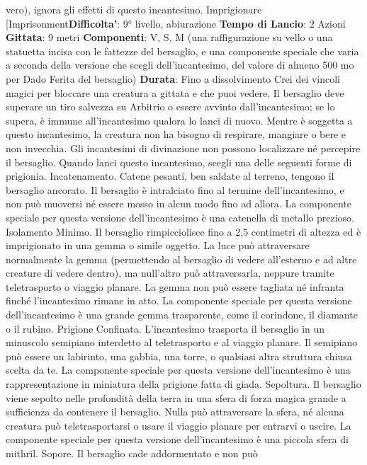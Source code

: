 \begin{multicols}{2}
vero), ignora gli effetti di questo incantesimo.
Imprigionare
[Imprisonment\textbf{Difficolta'}:
9° livello, abiurazione
\textbf{Tempo di Lancio}: 2 Azioni
\textbf{Gittata}: 9 metri
\textbf{Componenti}: V, S, M (una raffigurazione su vello o una
statuetta incisa con le fattezze del bersaglio, e una
componente speciale che varia a seconda della
versione che scegli dell’incantesimo, del valore di
almeno 500 mo per Dado Ferita del bersaglio)
\textbf{Durata}: Fino a dissolvimento
Crei dei vincoli magici per bloccare una creatura a
gittata e che puoi vedere. Il bersaglio deve superare un
tiro salvezza su Arbitrio o essere avvinto
dall’incantesimo; se lo supera, è immune
all’incantesimo qualora lo lanci di nuovo. Mentre è
soggetta a questo incantesimo, la creatura non ha
bisogno di respirare, mangiare o bere e non invecchia.
Gli incantesimi di divinazione non possono localizzare
né percepire il bersaglio.
Quando lanci questo incantesimo, scegli una delle
seguenti forme di prigionia.
Incatenamento. Catene pesanti, ben saldate al
terreno, tengono il bersaglio ancorato. Il bersaglio è
intralciato fino al termine dell’incantesimo, e non può
muoversi né essere mosso in alcun modo fino ad allora.
La componente speciale per questa versione
dell’incantesimo è una catenella di metallo prezioso.
Isolamento Minimo. Il bersaglio rimpicciolisce fino a
2,5 centimetri di altezza ed è imprigionato in una
gemma o simile oggetto. La luce può attraversare
normalmente la gemma (permettendo al bersaglio di
vedere all’esterno e ad altre creature di vedere dentro),
ma null’altro può attraversarla, neppure tramite
teletrasporto o viaggio planare. La gemma non può
essere tagliata né infranta finché l’incantesimo rimane
in atto.
La componente speciale per questa versione
dell’incantesimo è una grande gemma trasparente,
come il corindone, il diamante o il rubino.
Prigione Confinata. L’incantesimo trasporta il
bersaglio in un minuscolo semipiano interdetto al
teletrasporto e al viaggio planare. Il semipiano può
essere un labirinto, una gabbia, una torre, o qualsiasi
altra struttura chiusa scelta da te.
La componente speciale per questa versione
dell’incantesimo è una rappresentazione in miniatura
della prigione fatta di giada.
Sepoltura. Il bersaglio viene sepolto nelle profondità
della terra in una sfera di forza magica grande a
sufficienza da
contenere il bersaglio. Nulla può attraversare la sfera,
né alcuna creatura può teletrasportarsi o usare il
viaggio planare per entrarvi o uscire.
La componente speciale per questa versione
dell’incantesimo è una piccola sfera di mithril.
Sopore. Il bersaglio cade addormentato e non può

\end{multicols}
